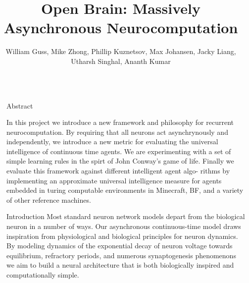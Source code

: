 \documentclass[final]{beamer}
\title{Open Brain: Massively Asynchronous Neurocomputation} %
\author{William Guss, Mike Zhong, Phillip Kuznetsov, Max Johansen, Jacky Liang, Utharsh Singhal, Ananth Kumar} %
\institute{Machine Learning at Berkeley} %
\newlength{\sepwid}
\newlength{\onecolwid}
\begin{document}

\setlength{\belowcaptionskip}{2ex} %
\setlength\belowdisplayshortskip{2ex} %

\begin{frame}[t] %

\begin{columns}[t] %

\begin{column}{\sepwid}\end{column} %

\begin{column}{\onecolwid} %


\begin{alertblock}{Abstract}

In this project we introduce a new framework and philosophy for recurrent neurocomputation. By requiring that all neurons act asynchrynously and independently,
we introduce a new metric for evaluating the universal intelligence of continuous
time agents. We are experimenting with a set of simple learning rules in the spirt of John Conway's game of life. Finally we evaluate this framework against different intelligent agent algo-
rithms by implementing an approximate universal intelligence measure for agents
embedded in turing computable environments in Minecraft, BF, and a variety of
other reference machines.
\end{alertblock}


\begin{block}{Introduction}
Most standard neuron network models depart from the biological neuron in a number of ways. Our asynchronous continuous-time model draws inspiration from physiological and biological principles for neuron dynamics. By modeling dynamics of the exponential decay of neuron voltage towards equilibrium, refractory periods, and numerous synaptogenesis phenomenons we aim to build a neural architecture that is both biologically inspired and computationally simple. 
\end{block}


\end{column}
\end{columns}
\end{frame}
\end{document}
